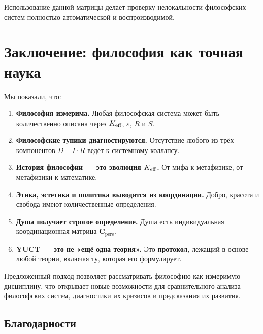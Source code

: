 \documentclass[12pt,a4paper]{article}
\newcommand{\eps}{\varepsilon}
\newcommand{\Cpers}{\mathbf{C}_{\text{pers}}}
\begin{document}
	Использование данной матрицы делает проверку нелокальности философских систем полностью автоматической и воспроизводимой.
	
	
	\section{Заключение: философия как точная наука}
	
	Мы показали, что:
	
	\begin{enumerate}
		\item \textbf{Философия измерима.} Любая философская система может быть количественно описана через \(\Keff\), \(\eps\), \(R\) и \(S\).
		\item \textbf{Философские тупики диагностируются.} Отсутствие любого из трёх компонентов \(D + I \cdot R\) ведёт к системному коллапсу.
		\item \textbf{История философии — это эволюция \(\Keff\).} От мифа к метафизике, от метафизики к математике.
		\item \textbf{Этика, эстетика и политика выводятся из координации.} Добро, красота и свобода имеют количественные определения.
		\item \textbf{Душа получает строгое определение.} Душа есть индивидуальная координационная матрица \(\Cpers\).
		\item \textbf{YUCT — это не «ещё одна теория».} Это \textbf{протокол}, лежащий в основе любой теории, включая ту, которая его формулирует.
	\end{enumerate}
	
	Предложенный подход позволяет рассматривать философию как измеримую дисциплину, что открывает новые возможности для сравнительного анализа философских систем, диагностики их кризисов и предсказания их развития.
	
	\begin{center}
	\end{center}
	
	\subsection*{Благодарности}
	
\end{document}
